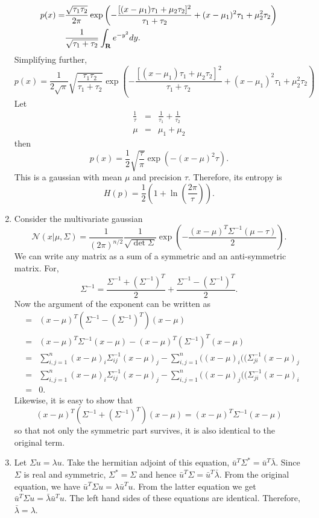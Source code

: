 \begin{enumerate}
\[\begin{split}
p(x) = & \frac{\sqrt{\tau_1\tau_2}}{2\pi}\exp\left(-\frac{[(x - \mu_1)\tau_1 + \mu_2\tau_2]^2}{\tau_1 + \tau_2} + (x - \mu_1)^2\tau_1 + \mu_2^2\tau_2\right) \\
 & \frac{1}{\sqrt{\tau_1+\tau_2}}\int_{\mathbf{R}} e^{-y^2}dy.
\end{split}
\]
Simplifying further,
\[
p(x) = \frac{1}{2\sqrt{\pi}}\sqrt{\frac{\tau_1\tau_2}{\tau_1 + \tau_2}}\exp\left(-\frac{[(x - \mu_1)\tau_1 + \mu_2\tau_2]^2}{\tau_1 + \tau_2} + (x - \mu_1)^2\tau_1 + \mu_2^2\tau_2\right) 
\]
Let
\begin{eqnarray*}
\frac{1}{\tau} &=& \frac{1}{\tau_1} + \frac{1}{\tau_2} \\
\mu &=& \mu_1 + \mu_2
\end{eqnarray*}
then
\[
p(x) = \frac{1}{2}\sqrt{\frac{\tau}{\pi}}\exp\left(-(x - \mu)^2\tau\right).
\]
This is a gaussian with mean $\mu$ and precision $\tau$. Therefore, its entropy is
\[
H(p) = \frac{1}{2}\left(1 + \ln\left(\frac{2\pi}{\tau}\right)\right).
\]

\item Consider the multivariate gaussian
\[
\mathcal{N}(x|\mu,\Sigma) = \frac{1}{(2\pi)^{n/2}}\frac{1}{\sqrt{\det\Sigma}}\exp\left(-\frac{(x - \mu)^T\Sigma^{-1}(\mu - \tau)}{2}\right).
\]
We can write any matrix as a sum of a symmetric and an anti-symmetric matrix. For,
\[
\Sigma^{-1} = \frac{\Sigma^{-1} + (\Sigma^{-1})^T}{2} + \frac{\Sigma^{-1} - (\Sigma^{-1})^T}{2}.
\]
Now the argument of the exponent can be written as
\begin{eqnarray*}
 &=& (x - \mu)^T(\Sigma^{-1} - (\Sigma^{-1})^T)(x - \mu) \\
 &=& (x - \mu)^T\Sigma^{-1}(x - \mu) - (x - \mu)^T(\Sigma^{-1})^T(x - \mu) \\
 &=& \sum_{i,j=1}^n(x - \mu)_i\Sigma^{-1}_{ij}(x - \mu)_j - \sum_{i,j=1}^n((x - \mu)_i((\Sigma^{-1}_{ji}(x - \mu)_j \\
 &=& \sum_{i,j=1}^n(x - \mu)_i\Sigma^{-1}_{ij}(x - \mu)_j - \sum_{i,j=1}^n((x - \mu)_j((\Sigma^{-1}_{ji}(x - \mu)_i \\
 &=& 0.
\end{eqnarray*}
Likewise, it is easy to show that
\[
(x - \mu)^T(\Sigma^{-1} + (\Sigma^{-1})^T)(x - \mu) = (x - \mu)^T\Sigma^{-1}(x - \mu)
\]
so that not only the symmetric part survives, it is also identical to the original term.

\item Let $\Sigma u = \lambda u$. Take the hermitian adjoint of this equation, $\bar{u}^T\Sigma^\ast
= \bar{u}^T\bar{\lambda}$. Since $\Sigma$ is real and symmetric, $\Sigma^\ast = \Sigma$ and hence
$\bar{u}^T\Sigma = \bar{u}^T\bar{\lambda}$. From the original equation, we have $\bar{u}^T\Sigma u = 
\lambda \bar{u}^T u$. From the latter equation we get $\bar{u}^T\Sigma u = \bar{\lambda}\bar{u}^T u$.
The left hand sides of these equations are identical. Therefore, $\bar{\lambda} = \lambda$.


\end{enumerate}
